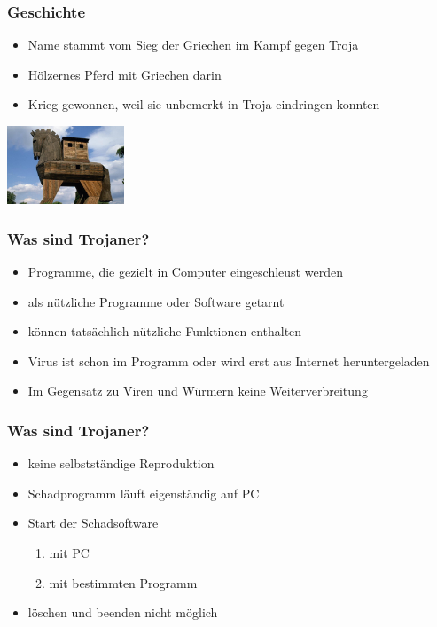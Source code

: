 \documentclass{beamer}
\begin{document}
\begin{frame}
	\frametitle{Geschichte}
	\begin{itemize}
		\item Name stammt vom Sieg der Griechen im Kampf gegen Troja
		\item Hölzernes Pferd mit Griechen darin
		\item Krieg gewonnen, weil sie unbemerkt in Troja eindringen konnten
	\end{itemize}
	\flushright
	\includegraphics[width= 3.5cm]{bilder/pferd.jpg}
\end{frame}

\begin{frame}
	\frametitle{Was sind Trojaner?}
	\begin{itemize}
		\item Programme, die gezielt in Computer eingeschleust werden
		\item als nützliche Programme oder Software getarnt
		\item können tatsächlich nützliche Funktionen enthalten
		\item Virus ist schon im Programm oder wird erst aus Internet heruntergeladen
		\item Im Gegensatz zu Viren und Würmern keine Weiterverbreitung
	\end{itemize}
\end{frame}

\begin{frame}
	\frametitle{Was sind Trojaner?}
	\begin{itemize}
		\item keine selbstständige Reproduktion
		\item Schadprogramm läuft eigenständig auf PC
		\item Start der Schadsoftware
		\begin{enumerate}
			\item mit PC
			\item mit bestimmten Programm
		\end{enumerate}
		\item löschen und beenden nicht möglich
	\end{itemize}
\end{frame}
\end{document}
